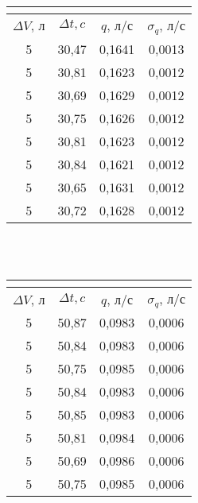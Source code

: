 \documentclass[a4paper,12pt]{article}
\begin{document}
\begin{enumerate}
\begin{center}
			\begin{tabular}{|c|c|c|c|}
				\hline
				\multicolumn{4}{|c|}{\text{Измерение расхода $q_1$}} \\
				\hline
				$\Delta V$, л & $\Delta t, c$ & $q$, л/с  & $\sigma_q$, л/с \\ \hline
				5             & 30,47         & 0,1641    & 0,0013          \\ \hline
				5             & 30,81         & 0,1623    & 0,0012	 	    \\\hline
				5             & 30,69         & 0,1629    & 0,0012          \\ \hline
				5             & 30,75         & 0,1626    & 0,0012          \\ \hline
				5             & 30,81         & 0,1623    & 0,0012          \\ \hline
				5             & 30,84         & 0,1621    & 0,0012          \\ \hline
				5             & 30,65         & 0,1631    & 0,0012          \\ \hline
				5             & 30,72         & 0,1628    & 0,0012          \\ \hline
			\end{tabular}
			     \\ \phantom{Русичи} \\
			\begin{tabular}{|c|c|c|c|}
				\hline
				\multicolumn{4}{|c|}{\text{Измерение расхода $q_2$}} \\
				\hline
				$\Delta V$, л & $\Delta t, c$ & $q$, л/с  & $\sigma_q$, л/с \\ \hline
				5             & 50,87         & 0,0983    & 0,0006          \\ \hline
				5             & 50,84         & 0,0983    & 0,0006	 	    \\\hline
				5             & 50,75         & 0,0985    & 0,0006          \\ \hline
				5             & 50,84         & 0,0983    & 0,0006          \\ \hline
				5             & 50,85         & 0,0983    & 0,0006          \\ \hline
				5             & 50,81         & 0,0984    & 0,0006          \\ \hline
				5             & 50,69         & 0,0986    & 0,0006          \\ \hline
				5             & 50,75         & 0,0985    & 0,0006          \\ \hline
			\end{tabular}

\end{center}
\end{enumerate}
\end{document}
